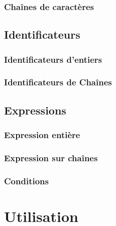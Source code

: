 \documentclass[11pt,a4paper,titlepage,openany,oneside]{book}
\begin{document}
             \subsection{Chaînes de caractères}
                

        \section{Identificateurs}
             

             \subsection{Identificateurs d'entiers}
                

             \subsection{Identificateurs de Chaînes}
                

        \section{Expressions}
            

            \subsection{Expression entière}
                

            \subsection{Expression sur chaînes}
                

            \subsection{Conditions}
                

    \chapter{Utilisation}
        
\end{document}

